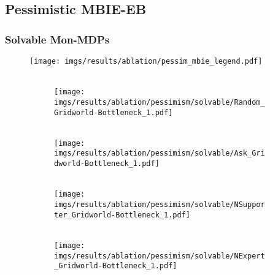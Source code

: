 \subsection{Pessimistic MBIE-EB}
\subsubsection{Solvable Mon-MDPs}
%
%
%
\begin{figure}[bth]
    \centering
    \texttt{[image: imgs/results/ablation/pessim\_mbie\_legend.pdf]}
    \\[3pt]
    \hfill
    \begin{subfigure}[b]{0.16\linewidth}
        \centering
        \\
        \texttt{[image: imgs/results/ablation/pessimism/solvable/Random\_Gridworld-Bottleneck\_1.pdf]}
    \end{subfigure} 
    \hfill
        \begin{subfigure}[b]{0.16\linewidth}
        \centering
        \\
        \texttt{[image: imgs/results/ablation/pessimism/solvable/Ask\_Gridworld-Bottleneck\_1.pdf]}
    \end{subfigure} 
    \hfill
        \begin{subfigure}[b]{0.16\textwidth}
        \centering
        \\
        \texttt{[image: imgs/results/ablation/pessimism/solvable/NSupporter\_Gridworld-Bottleneck\_1.pdf]}
    \end{subfigure} 
    \hfill
    \begin{subfigure}[b]{0.16\textwidth}
        \centering
        \\
        \texttt{[image: imgs/results/ablation/pessimism/solvable/NExpert\_Gridworld-Bottleneck\_1.pdf]}
    \end{subfigure} 
    \hfill
    \begin{subfigure}[b]{0.16\textwidth}
        \centering

\end{subfigure}
\end{figure}
